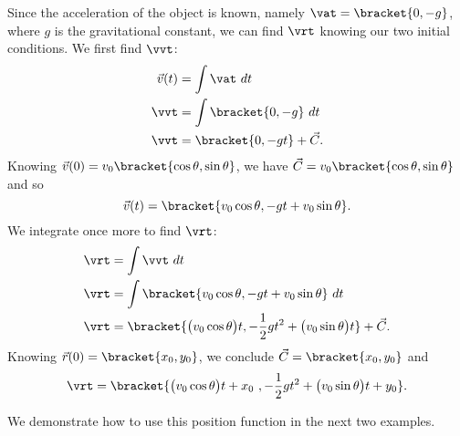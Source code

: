 Since the acceleration of the object is known, namely $\vat =\bracket{0,-g}$, where $g$ is the gravitational constant, we can find $\vrt$ knowing our two initial conditions. We first find $\vvt$:
\begin{align*}
\vec v(t) &= \int \vat \ dt\\
\vvt &= \int\bracket{0,-g}\ dt\\
\vvt &=\bracket{0,-gt}+ \vec C.
\end{align*}
Knowing $\vec v(0) = v_0\bracket{\cos \theta,\sin \theta}$, we have $\vec C = v_0\bracket{\cos\theta,\sin\theta}$ and so
\[\vec v(t) =\bracket{v_0\cos \theta, -gt+v_0\sin\theta}.\]
We integrate once more to find $\vrt$:
\begin{align*}
\vrt &= \int \vvt\ dt \\
\vrt &= \int\bracket{v_0\cos \theta, -gt+v_0\sin\theta}\ dt\\
\vrt &=\bracket{\big(v_0\cos \theta\big)t, -\frac12gt^2+\big(v_0\sin\theta\big)t}+ \vec C.
\end{align*}
Knowing $\vec r(0) =\bracket{x_0,y_0}$, we conclude $\vec C =\bracket{x_0,y_0}$ and
\begin{equation}
\vrt
=\bracket{\big(v_0\cos\theta\big)t+x_0\ ,-\frac12gt^2+\big(v_0\sin\theta\big)t+y_0}.
\label{idea:projectile}
\end{equation}


We demonstrate how to use this position function in the next two examples.


